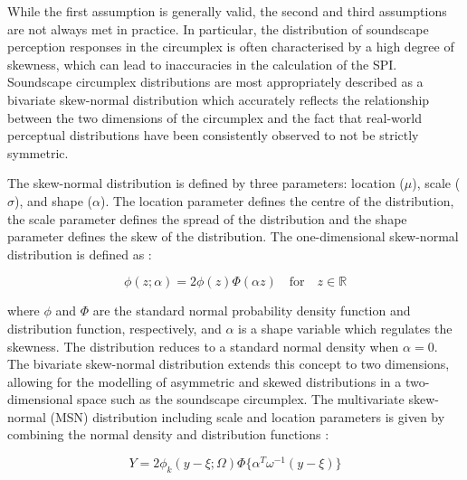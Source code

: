 \documentclass[
  authoryear,
  preprint,
  3p]{elsarticle}
\begin{document}
While the first assumption is generally valid, the second and third
assumptions are not always met in practice. In particular, the
distribution of soundscape perception responses in the circumplex is
often characterised by a high degree of skewness, which can lead to
inaccuracies in the calculation of the SPI. Soundscape circumplex
distributions are most appropriately described as a bivariate
skew-normal distribution \citep{Azzalini2005Skew} which accurately
reflects the relationship between the two dimensions of the circumplex
and the fact that real-world perceptual distributions have been
consistently observed to not be strictly symmetric.

The skew-normal distribution is defined by three parameters: location
(\(\mu\)), scale (\(\sigma\)), and shape (\(\alpha\)). The location
parameter defines the centre of the distribution, the scale parameter
defines the spread of the distribution and the shape parameter defines
the skew of the distribution. The one-dimensional skew-normal
distribution is defined as \citep{Azzalini1996Multivariate}:

\[
\phi(z; \alpha) = 2 \phi(z) \Phi(\alpha z) \quad \text{for} \quad z \in \mathbb{R}
\]

where \(\phi\) and \(\Phi\) are the standard normal probability density
function and distribution function, respectively, and \(\alpha\) is a
shape variable which regulates the skewness. The distribution reduces to
a standard normal density when \(\alpha = 0\). The bivariate skew-normal
distribution extends this concept to two dimensions, allowing for the
modelling of asymmetric and skewed distributions in a two-dimensional
space such as the soundscape circumplex. The multivariate skew-normal
(MSN) distribution including scale and location parameters is given by
combining the normal density and distribution functions
\citep{Azzalini1999Statistical}:

\[
Y = 2 \phi_k (y-\xi; \Omega) \Phi\{\alpha^T\omega^{-1}(y-\xi)\}
\]
\end{document}
